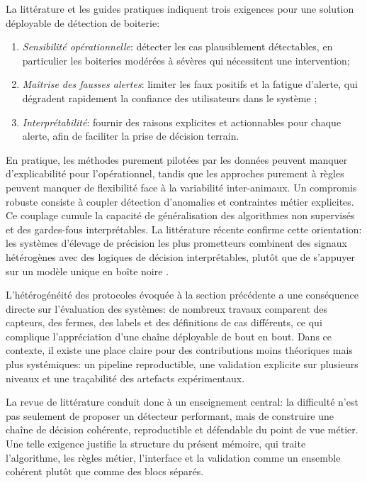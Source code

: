 La littérature et les guides pratiques indiquent trois exigences pour une solution déployable
de détection de boiterie:
\begin{enumerate}
  \item \textit{Sensibilité opérationnelle}: détecter les cas plausiblement détectables,
  en particulier les boiteries modérées à sévères qui nécessitent une intervention;
  \item \textit{Maîtrise des fausses alertes}: limiter les faux positifs et la fatigue
  d'alerte, qui dégradent rapidement la confiance des utilisateurs dans le système
  \citep{rutten2013invited};
  \item \textit{Interprétabilité}: fournir des raisons explicites et actionnables pour
  chaque alerte, afin de faciliter la prise de décision terrain.
\end{enumerate}

En pratique, les méthodes purement pilotées par les données peuvent manquer d'explicabilité pour
l'opérationnel, tandis que les approches purement à règles peuvent manquer de flexibilité
face à la variabilité inter-animaux. Un compromis robuste consiste à coupler détection
d'anomalies et contraintes métier explicites. Ce couplage cumule la
capacité de généralisation des algorithmes non supervisés et des gardes-fous
interprétables. La littérature récente confirme cette orientation: les systèmes
d'élevage de précision les plus prometteurs combinent des signaux hétérogènes avec des
logiques de décision interprétables, plutôt que de s'appuyer sur un modèle unique en boîte
noire \citep{palma2025scoping,michelena2025plf_review}.

L'hétérogénéité des protocoles évoquée à la section précédente a une conséquence directe
sur l'évaluation des systèmes: de nombreux travaux comparent des capteurs, des fermes, des
labels et des définitions de cas différents, ce qui complique l'appréciation d'une chaîne
déployable de bout en bout. Dans ce contexte, il existe une place claire pour des
contributions moins théoriques mais plus systémiques: un pipeline reproductible, une
validation explicite sur plusieurs niveaux et une traçabilité des artefacts expérimentaux.

La revue de littérature conduit donc à un enseignement central: la difficulté n'est pas
seulement de proposer un détecteur performant, mais de construire une chaîne de décision
cohérente, reproductible et défendable du point de vue métier. Une telle exigence justifie
la structure du présent mémoire, qui traite l'algorithme, les règles métier, l'interface et
la validation comme un ensemble cohérent plutôt que comme des blocs séparés.

